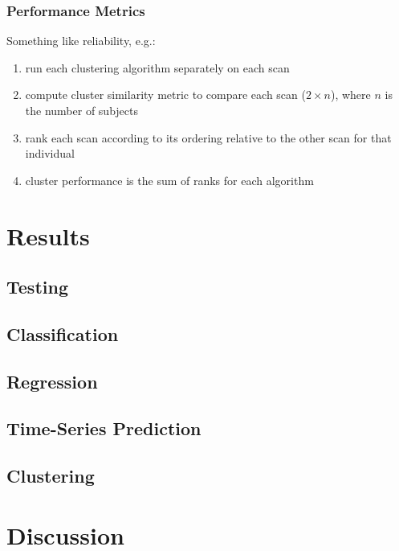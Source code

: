 \subsubsection{Performance Metrics}

Something like reliability, e.g.:

\begin{enumerate} \itemsep0pt
	\item run each clustering algorithm separately on each scan
	\item compute cluster similarity metric to compare each scan ($2 \times n$), where $n$ is the number of subjects
	\item rank each scan according to its ordering relative to the other scan for that individual
	\item cluster performance is the sum of ranks for each algorithm
\end{enumerate} 





\section{Results} \label{sec:results}

\subsection{Testing}

\subsection{Classification}

\subsection{Regression}

\subsection{Time-Series Prediction}


\subsection{Clustering}

\section{Discussion} \label{sec:disc}


\newpage
\small{


}



